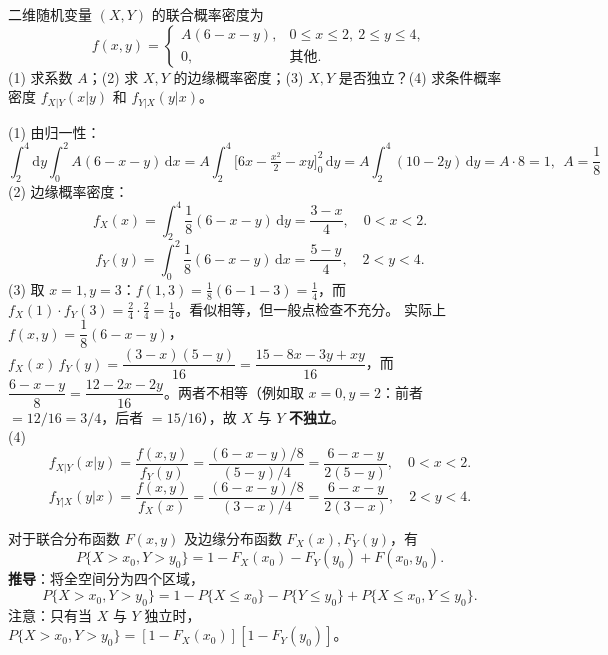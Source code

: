 \documentclass[lang=cn,11pt]{elegantbook}
\begin{document}
\begin{exercise} \label{exer:3-4b}
二维随机变量 $(X,Y)$ 的联合概率密度为
\[
f(x,y) = \begin{cases} A(6-x-y), & 0 \leqslant x \leqslant 2,\ 2 \leqslant y \leqslant 4, \\ 0, & \text{其他}. \end{cases}
\]
(1) 求系数 $A$；(2) 求 $X, Y$ 的边缘概率密度；(3) $X, Y$ 是否独立？(4) 求条件概率密度 $f_{X|Y}(x|y)$ 和 $f_{Y|X}(y|x)$。
\end{exercise}
\begin{solution}
(1) 由归一性：
\[
\int_2^4\mathrm{d}y\int_0^2 A(6-x-y)\,\mathrm{d}x = A\int_2^4\bigl[6x - \tfrac{x^2}{2} - xy\bigr]_0^2\,\mathrm{d}y = A\int_2^4(10 - 2y)\,\mathrm{d}y = A \cdot 8 = 1,~~A = \frac18
\]
(2) 边缘概率密度：
\[
f_X(x) = \int_2^4 \frac{1}{8}(6-x-y)\,\mathrm{d}y = \frac{3-x}{4}, \quad 0 < x < 2.
\]
\[
f_Y(y) = \int_0^2 \frac{1}{8}(6-x-y)\,\mathrm{d}x = \frac{5-y}{4}, \quad 2 < y < 4.
\]
(3) 取 $x=1, y=3$：$f(1,3) = \frac{1}{8}(6-1-3) = \frac{1}{4}$，而 $f_X(1) \cdot f_Y(3) = \frac{2}{4} \cdot \frac{2}{4} = \frac{1}{4}$。看似相等，但一般点检查不充分。
实际上 $f(x,y) = \dfrac{1}{8}(6-x-y)$，$f_X(x)\,f_Y(y) = \dfrac{(3-x)(5-y)}{16} = \dfrac{15 - 8x - 3y + xy}{16}$，而 $\dfrac{6-x-y}{8} = \dfrac{12 - 2x - 2y}{16}$。两者不相等（例如取 $x=0, y=2$：前者 $= 12/16 = 3/4$，后者 $= 15/16$），故 $X$ 与 $Y$ \textbf{不独立}。\\
(4)
\[
f_{X|Y}(x|y) = \frac{f(x,y)}{f_Y(y)} = \frac{(6-x-y)/8}{(5-y)/4} = \frac{6-x-y}{2(5-y)}, \quad 0 < x < 2.
\]
\[
f_{Y|X}(y|x) = \frac{f(x,y)}{f_X(x)} = \frac{(6-x-y)/8}{(3-x)/4} = \frac{6-x-y}{2(3-x)}, \quad 2 < y < 4.
\]
\end{solution}
\begin{property}[区域概率公式]\label{prop:region-prob}
对于联合分布函数 $F(x,y)$ 及边缘分布函数 $F_X(x), F_Y(y)$，有
\[
P\{X > x_0, Y > y_0\} = 1 - F_X(x_0) - F_Y(y_0) + F(x_0, y_0).
\]
\textbf{推导}：将全空间分为四个区域，
\[
P\{X > x_0, Y > y_0\} = 1 - P\{X \leqslant x_0\} - P\{Y \leqslant y_0\} + P\{X \leqslant x_0, Y \leqslant y_0\}.
\]
注意：只有当 $X$ 与 $Y$ 独立时，$P\{X > x_0, Y > y_0\} = [1-F_X(x_0)][1-F_Y(y_0)]$。
\end{property}
\end{document}
